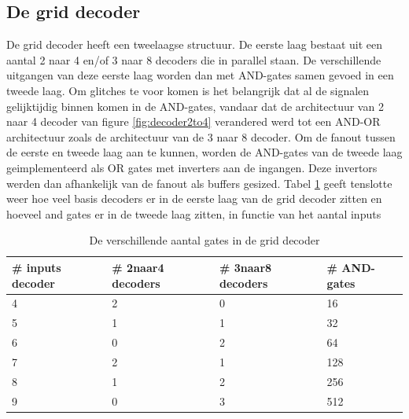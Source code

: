 \subsection{De grid decoder}
De grid decoder heeft een tweelaagse structuur. De eerste laag bestaat uit een aantal 2 naar 4 en/of 3 naar 8 decoders die in parallel staan. De verschillende uitgangen van deze eerste laag worden dan met AND-gates samen gevoed in een tweede laag. Om glitches te voor komen is het belangrijk dat al de signalen gelijktijdig binnen komen in de AND-gates, vandaar dat de architectuur van 2 naar 4 decoder van figure \ref{fig:decoder2to4} verandered werd tot een AND-OR architectuur zoals de architectuur van de 3 naar 8 decoder. Om de fanout tussen de eerste en tweede laag aan te kunnen, worden de AND-gates van de tweede laag geimplementeerd als OR gates met inverters aan de ingangen. Deze invertors werden dan afhankelijk van de fanout als buffers gesized. Tabel \ref{tab:griddecoder} geeft tenslotte weer hoe veel basis decoders er in de eerste laag van de grid decoder zitten en hoeveel and gates er in de tweede laag zitten, in functie van het aantal inputs

\begin{table}
\begin{center}
\begin{tabular}{llll}
\hline
\# inputs decoder & \# 2naar4 decoders & \# 3naar8 decoders & \# AND-gates\\
\hline
4 & 2 & 0 & 16\\
5 & 1 & 1 & 32\\
6 & 0 & 2 & 64\\
7 & 2 & 1 & 128\\
8 & 1 & 2 & 256\\
9 & 0 & 3 & 512\\
\hline
\end{tabular}
\end{center}
\caption{De verschillende aantal gates in de grid decoder}
\label{tab:griddecoder}
\end{table}

